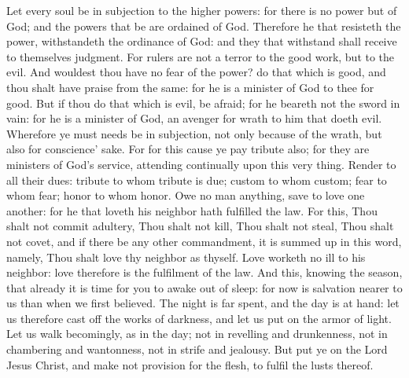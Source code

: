 Let every soul be in subjection to the higher powers: for there is no power but of God; and the powers that be are ordained of God. Therefore he that resisteth the power, withstandeth the ordinance of God: and they that withstand shall receive to themselves judgment. For rulers are not a terror to the good work, but to the evil. And wouldest thou have no fear of the power? do that which is good, and thou shalt have praise from the same: for he is a minister of God to thee for good. But if thou do that which is evil, be afraid; for he beareth not the sword in vain: for he is a minister of God, an avenger for wrath to him that doeth evil. Wherefore ye must needs be in subjection, not only because of the wrath, but also for conscience’ sake. For for this cause ye pay tribute also; for they are ministers of God’s service, attending continually upon this very thing. Render to all their dues: tribute to whom tribute is due; custom to whom custom; fear to whom fear; honor to whom honor.  Owe no man anything, save to love one another: for he that loveth his neighbor hath fulfilled the law. For this, Thou shalt not commit adultery, Thou shalt not kill, Thou shalt not steal, Thou shalt not covet, and if there be any other commandment, it is summed up in this word, namely, Thou shalt love thy neighbor as thyself. Love worketh no ill to his neighbor: love therefore is the fulfilment of the law.  And this, knowing the season, that already it is time for you to awake out of sleep: for now is salvation nearer to us than when we first believed. The night is far spent, and the day is at hand: let us therefore cast off the works of darkness, and let us put on the armor of light. Let us walk becomingly, as in the day; not in revelling and drunkenness, not in chambering and wantonness, not in strife and jealousy. But put ye on the Lord Jesus Christ, and make not provision for the flesh, to fulfil the lusts thereof. 


